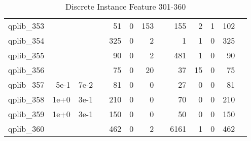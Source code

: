 \begin{table}
\begin{tabular}{lrrrrrrrrrrrr}
qplib\_353	&		&		&	&	51	&	0	&	153	&	&	155	&	2	&	1	&	102	\\
qplib\_354	&		&		&	&	325	&	0	&	2	&	&	1	&	1	&	0	&	325	\\
qplib\_355	&		&		&	&	90	&	0	&	2	&	&	481	&	1	&	0	&	90	\\
qplib\_356	&		&		&	&	75	&	0	&	20	&	&	37	&	15	&	0	&	75	\\
qplib\_357	&	5e-1	&	7e-2	&	&	81	&	0	&	0	&	&	27	&	0	&	0	&	81	\\
qplib\_358	&	1e+0	&	3e-1	&	&	210	&	0	&	0	&	&	70	&	0	&	0	&	210	\\
qplib\_359	&	1e+0	&	3e-1	&	&	150	&	0	&	0	&	&	50	&	0	&	0	&	150	\\
qplib\_360	&		&		&	&	462	&	0	&	2	&	&	6161	&	1	&	0	&	462	\\


\bottomrule

\end{tabular}  
\label{tab:A6}
\caption{Discrete  Instance Feature 301-360} 

\end{table}

